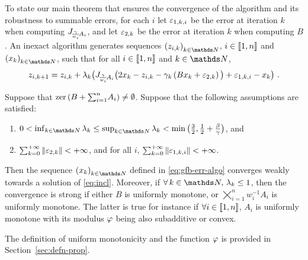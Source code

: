 To state our main theorem that ensures the convergence of the algorithm and its robustness to summable errors, for each $i$ let $\varepsilon_{1,k,i}$ be the error at iteration $k$ when computing $J_{\!\frac{\gamma}{w_i}\!A_i}$, and let $\varepsilon_{2,k}$ be the error at iteration $k$ when computing $B$. An inexact \GFB algorithm generates sequences $\pa{z_{i,k}}_{k \in \N}$, $i \in \llbracket1,n\rrbracket$ and $\pa{x_k}_{k \in \N}$, such that for all $i \in \llbracket1,n\rrbracket$ and $k \in \N$,
%
\begin{equation}\label{eq:gfb-err-algo}
	z_{i,k+1} = z_{i,k} + \la_k \bpa{ \JgAi \bpa{ 2 x_k - z_{i,k} - 
	\ga_k \pa{ B x_k + \Eps_{2,k} } } + \Eps_{1,k,i} - x_k } ~.
\end{equation}

\begin{theorem}
Suppose that $\operatorname{zer} \left(  B + {\textstyle \sum_{i=1}^{n}} A_i  \right) \neq \emptyset$. Suppose that the following assumptions are satisfied:
%
\begin{enumerate}[label={\rm (\roman{*})}, ref={\rm (\roman{*})}]
	\item{\label{h:lim-la-algo}} $0 < \inf_{k \in \N} \la_k \leq \sup_{k \in \N} \la_k < \min\bpa{\textfrac{3}{2},\textfrac{1}{2}+\textfrac{\be}{\ga}}$, and 
	\item{\label{h:sum-err-algo}} $\sum_{k=0}^{{+}\infty} |\kern-1pt| \varepsilon_{2,k} |\kern-1pt| < {+}\infty$, and for all $i$, $\sum_{k=0}^{{+}\infty} |\kern-1pt| \varepsilon_{1,k,i} |\kern-1pt| < {+}\infty$.
\end{enumerate}
%
Then the sequence $\pa{x_k}_{k \in \N}$ defined in \eqref{eq:gfb-err-algo} converges weakly towards a solution of \eqref{eq:incl}. Moreover, if $\foralls k \in \N, \, \la_k \leq 1$, then the convergence is strong if either $B$ is uniformly monotone, or $\bigtimes_{i=1}^n w_i^{-1} A_i$ is uniformly monotone. The latter is true for instance if $\forall i \in \llbracket1,n\rrbracket$, $A_i$ is uniformly monotone with its modulus $\varphi$ being also subadditive or convex.
\label{thm:gfb-algo}
\end{theorem}

\medskip

The definition of uniform monotonicity and the function $\varphi$ is provided in Section~\ref{sec:defn-prop}.\\


